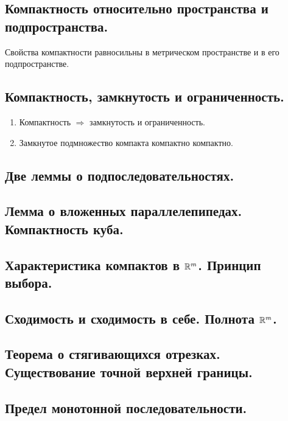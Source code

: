 \documentclass[12pt, a4paper]{article}
\begin{document}
\subsection{Компактность относительно пространства и подпространства.}

Свойства компактности равносильны 
в метрическом пространстве и в его подпространстве.


\subsection{Компактность, замкнутость и ограниченность.}

\begin{enumerate}
    \item Компактность $\Rightarrow$ замкнутость и ограниченность.
    \item Замкнутое подмножество компакта компактно компактно.
\end{enumerate}


\subsection{Две леммы о подпоследовательностях.}

\subsection{Лемма о вложенных параллелепипедах. Компактность куба.}

\subsection{Характеристика компактов в ${\mathbb{R}}^m$. Принцип выбора.}

\subsection{Сходимость и сходимость в себе. Полнота ${\mathbb{R}}^m$.}

\subsection{Теорема о стягивающихся отрезках. Существование точной верхней границы.}

\subsection{Предел монотонной последовательности.}
\end{document}
